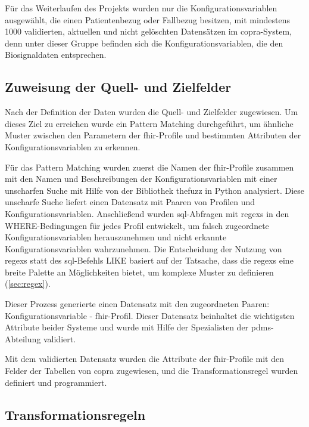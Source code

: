 Für das Weiterlaufen des Projekts wurden nur die Konfigurationsvariablen ausgewählt, die einen Patientenbezug oder Fallbezug besitzen, mit mindestens 1000 validierten, aktuellen und nicht gelöschten Datensätzen im \ac{copra}-System, denn unter dieser Gruppe befinden sich die Konfigurationsvariablen, die den Biosignaldaten entsprechen.

\subsection{Zuweisung der Quell- und Zielfelder} \label{sec:patternmatchingicucopra}

Nach der Definition der Daten wurden die Quell- und Zielfelder zugewiesen. Um dieses Ziel zu erreichen wurde ein Pattern Matching durchgeführt, um ähnliche Muster zwischen den Parametern der \ac{fhir}-Profile und bestimmten Attributen der Konfigurationsvariablen zu erkennen. 

Für das Pattern Matching wurden zuerst die Namen der \ac{fhir}-Profile zusammen mit den Namen und Beschreibungen der Konfigurationsvariablen mit einer unscharfen Suche mit Hilfe von der Bibliothek \glqq thefuzz\grqq{} in Python analysiert. Diese unscharfe Suche liefert einen Datensatz mit Paaren von Profilen und Konfigurationsvariablen. Anschließend wurden \ac{sql}-Abfragen mit \acp{regex} in den \glqq WHERE\grqq{}-Bedingungen für jedes Profil entwickelt, um falsch zugeordnete Konfigurationsvariablen herauszunehmen und nicht erkannte Konfigurationsvariablen wahrzunehmen. Die Entscheidung der Nutzung von \acp{regex} statt des \ac{sql}-Befehls \glqq LIKE\grqq{} basiert auf der Tatsache, dass die \acp{regex} eine breite Palette an Möglichkeiten bietet, um komplexe Muster zu definieren (\ref{sec:regex}).

Dieser Prozess generierte einen Datensatz mit den zugeordneten Paaren: Konfigurationsvariable - \ac{fhir}-Profil. Dieser Datensatz beinhaltet die wichtigsten Attribute beider Systeme und wurde mit Hilfe der Spezialisten der \ac{pdms}-Abteilung validiert.

Mit dem validierten Datensatz wurden die Attribute der \ac{fhir}-Profile mit den Felder der Tabellen von \ac{copra} zugewiesen, und die Transformationsregel wurden definiert und programmiert.

\subsection{Transformationsregeln} \label{sec:transformrules}

